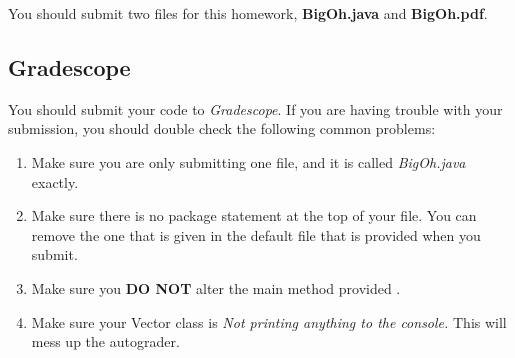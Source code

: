 \documentclass[paper=a4, fontsize=11pt, parskip=full]{scrartcl} %
\numberwithin{equation}{section} %
\numberwithin{figure}{section} %
\numberwithin{table}{section} %
\begin{document}
You should submit two files for this homework, \textbf{BigOh.java} and \textbf{BigOh.pdf}.

\subsection{Gradescope}

You should submit your code to \emph{Gradescope}. If you are having trouble with your submission, you should double check the following common problems:

\begin{enumerate}
	\item Make sure you are only submitting one file, and it is called \emph{BigOh.java} exactly.
	\item Make sure there is no package statement at the top of your file. You can remove the one that is given in the default file that is provided when you submit.
	\item Make sure you \textbf{DO NOT} alter the main method provided .
	\item Make sure your Vector class is \emph{Not printing anything to the console.} This will mess up the autograder.
\end{enumerate}

\end{document}
